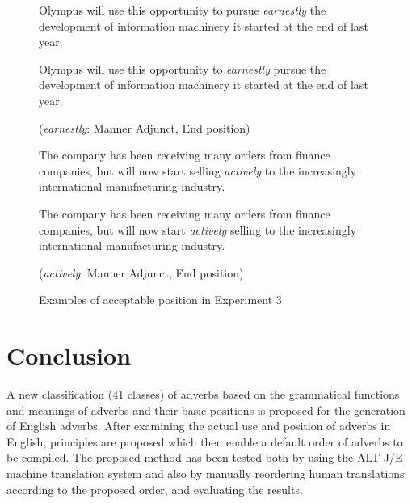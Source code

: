\begin{singlespace} 
\begin{figure}[htbp]
    \leavevmode
\begin{description}
 \small
 \item[This Method\ \ \ \ \ \ \ ]
Olympus will use this opportunity to pursue {\em earnestly} the development of 
information machinery it started at the end of last year. 
 \item[Human Translation]
Olympus will use this opportunity to {\em earnestly} pursue the development of 
information machinery it started at the end of last year. 
 \item[] ({\em earnestly}: Manner Adjunct, End position)
\vspace*{2mm}
\end{description} 
\begin{description}
 \small
 \item[This Method\ \ \ \ \ \ \ ]
The company has been receiving many orders from finance companies, 
but will now start selling {\em actively} to the increasingly 
international manufacturing industry. 
 \item[Human Translation]
The company has been receiving many orders from finance companies, 
but will now start {\em actively} selling to the increasingly 
international manufacturing industry. 
 \item[] ({\em actively}:  Manner Adjunct, End position)
\end{description} 
    \caption{Examples of acceptable position in Experiment 3}
    \label{fig:acceptable-Ex3}
\end{figure}
\end{singlespace}

\section{Conclusion}
\label{sec:conclusion}

\vspace*{-5mm}

A new classification (41 classes) of adverbs based on the grammatical
functions and meanings of adverbs and their basic positions is
proposed for the generation of English adverbs. After examining the actual
use and position of adverbs in English, principles are proposed which
then enable a default order of adverbs to be compiled. 
The proposed method has been tested both by using the ALT-J/E machine 
translation system and also by manually reordering human translations
according to the proposed order, and evaluating the results.

